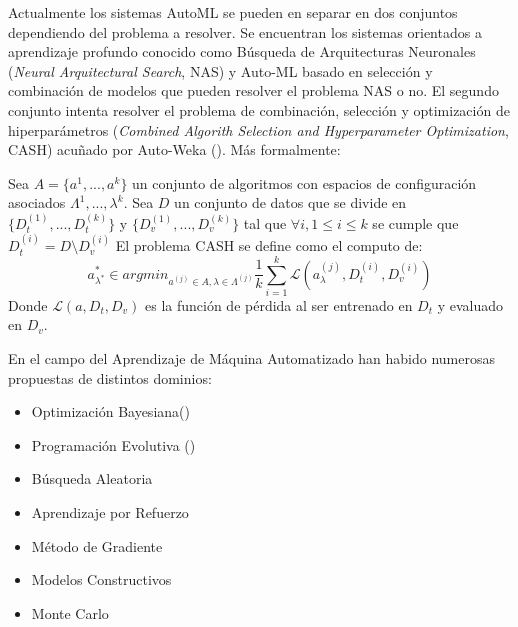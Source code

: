 Actualmente los sistemas AutoML se pueden en separar en dos conjuntos dependiendo del problema a resolver. Se encuentran los sistemas orientados a aprendizaje profundo conocido como B\'usqueda de Arquitecturas Neuronales (\textit{Neural Arquitectural Search}, NAS) y  Auto-ML basado en selecci\'on y combinaci\'on de modelos que pueden resolver el problema NAS o no. El segundo conjunto intenta resolver el problema de combinaci\'on, selecci\'on y optimizaci\'on de hiperpar\'ametros (\textit{Combined Algorith Selection and Hyperparameter Optimization}, CASH) acuñado por Auto-Weka (\cite{thornton2013auto}). M\'as formalmente:
\begin{definition}
    Sea $A = \{a^1, ..., a^k\}$  un conjunto de algoritmos con espacios de configuraci\'on asociados $\Lambda^1, ..., \lambda^k$.
    Sea $D$ un conjunto de datos  que se divide en $\{D_{t}^{(1)},..., D_{t}^{(k)}\}$ y $\{D_{v}^{(1)},..., D_{v}^{(k)}\}$ 
    tal que $\forall i, 1 \leq i \leq k$ se cumple que $D_{t}^{(i)} = D \setminus D^{(i)}_{v}$
    El problema CASH se define como el computo de:
    \begin{equation*}
        a^*_{\lambda^*} \in argmin_{a^{(j)} \in A, \lambda \in \Lambda^{(j)}} \frac{1}{k} \sum^{k}_{i = 1}\mathcal{L}(a^(j)_\lambda, D^{(i)}_t, D^{(i)}_v)
    \end{equation*}
    Donde $\mathcal{L}(a, D_t, D_v)$ es la funci\'on de p\'erdida al ser entrenado en $D_t$ y evaluado en $D_v$.
\end{definition}



En el campo del Aprendizaje de M\'aquina Automatizado han habido numerosas propuestas de distintos dominios:
\begin{itemize}
    \item Optimizaci\'on Bayesiana(\cite{hutter2019automated})
    \item Programaci\'on Evolutiva (\cite{chen2018autostacker})
    \item B\'usqueda Aleatoria 
    \item Aprendizaje por Refuerzo
    \item M\'etodo de Gradiente
    \item Modelos Constructivos
    \item Monte Carlo
\end{itemize}

